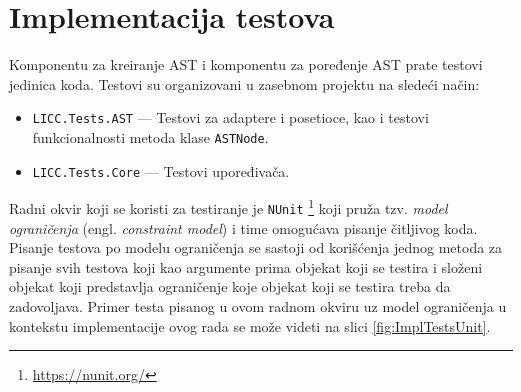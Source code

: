 \section{Implementacija testova}
\label{sec:ImplementationTests}

Komponentu za kreiranje AST i komponentu za poređenje AST prate testovi jedinica koda. Testovi su organizovani u zasebnom projektu na sledeći način:
\begin{itemize}
    \item \texttt{LICC.Tests.AST} --- Testovi za adaptere i posetioce, kao i testovi funkcionalnosti metoda klase \texttt{ASTNode}.
    \item \texttt{LICC.Tests.Core} --- Testovi upoređivača.
\end{itemize}

Radni okvir koji se koristi za testiranje je \texttt{NUnit} \footnote{\url{https://nunit.org/}} koji pruža tzv. \emph{model ograničenja} (engl. \emph{constraint model}) i time omogućava pisanje čitljivog koda. Pisanje testova po modelu ograničenja se sastoji od korišćenja jednog metoda za pisanje svih testova koji kao argumente prima objekat koji se testira i složeni objekat koji predstavlja ograničenje koje objekat koji se testira treba da zadovoljava. Primer testa pisanog u ovom radnom okviru uz model ograničenja u kontekstu implementacije ovog rada se može videti na slici \ref{fig:ImplTestsUnit}.

